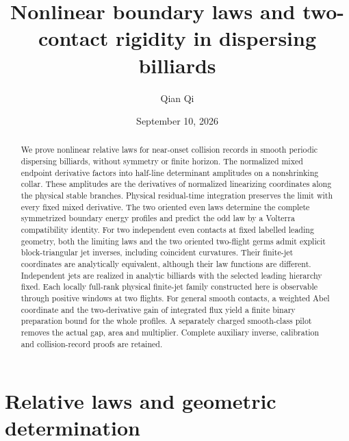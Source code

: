 
\title[Nonlinear boundary laws and two-contact rigidity]{Nonlinear boundary laws and two-contact rigidity
in dispersing billiards}
\author{Qian Qi}
\date{September 10, 2026}

\begin{abstract}
We prove nonlinear relative laws for near-onset collision records in
smooth periodic dispersing billiards, without symmetry or finite horizon.
The normalized mixed endpoint derivative factors into half-line
determinant amplitudes on a nonshrinking collar. These amplitudes
are the derivatives of normalized linearizing coordinates along the
physical stable branches. Physical residual-time integration preserves
the limit with every fixed mixed derivative. The two oriented even laws determine the complete
symmetrized boundary energy profiles and predict the odd law by a
Volterra compatibility identity. For two independent even contacts at
fixed labelled leading geometry, both the limiting laws and the two
oriented two-flight germs admit explicit block-triangular jet inverses,
including coincident curvatures. Their finite-jet coordinates are
analytically equivalent, although their law functions are different.
Independent jets are realized in analytic billiards with the selected
leading hierarchy fixed. Each locally full-rank physical finite-jet
family constructed here is observable through positive windows at two
flights. For general smooth
contacts, a weighted Abel coordinate and the two-derivative gain of
integrated flux yield a finite binary preparation bound for the whole
profiles. A separately charged smooth-class pilot removes the actual
gap, area and multiplier. Complete auxiliary inverse, calibration and
collision-record proofs are retained.
\end{abstract}
\maketitle

\part{Relative laws and geometric determination}











